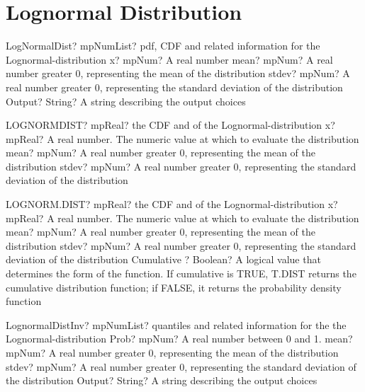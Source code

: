 \documentclass[12pt,a4paper,openany]{book}
\begin{document}
\section{Lognormal Distribution}

\begin{mpFunctionsExtract}
\mpFunctionFourNotImplemented
{LogNormalDist? mpNumList? pdf, CDF and related information for the Lognormal-distribution}
{x? mpNum? A real number}
{mean? mpNum? A real number greater 0, representing the mean of the distribution}
{stdev? mpNum? A real number greater 0, representing the standard deviation of the distribution}
{Output? String? A string describing the output choices}
\end{mpFunctionsExtract}

\begin{mpFunctionsExtract}
\mpWorksheetFunctionThreeNotImplemented
{LOGNORMDIST? mpReal? the CDF and of the Lognormal-distribution}
{x? mpReal? A real number. The numeric value at which to evaluate the distribution}
{mean? mpNum? A real number greater 0, representing the mean of the distribution}
{stdev? mpNum? A real number greater 0, representing the standard deviation of the distribution}
\end{mpFunctionsExtract}

\begin{mpFunctionsExtract}
\mpWorksheetFunctionFourNotImplemented
{LOGNORM.DIST? mpReal? the CDF and of the Lognormal-distribution}
{x? mpReal? A real number. The numeric value at which to evaluate the distribution}
{mean? mpNum? A real number greater 0, representing the mean of the distribution}
{stdev? mpNum? A real number greater 0, representing the standard deviation of the distribution}
{Cumulative ? Boolean? A logical value that determines the form of the function. If cumulative is TRUE, T.DIST returns the cumulative distribution function; if FALSE, it returns the probability density function}
\end{mpFunctionsExtract}

\begin{mpFunctionsExtract}
\mpFunctionFourNotImplemented
{LognormalDistInv? mpNumList? quantiles and related information for the the Lognormal-distribution}
{Prob? mpNum? A real number between 0 and 1.}
{mean? mpNum? A real number greater 0, representing the mean of the distribution}
{stdev? mpNum? A real number greater 0, representing the standard deviation of the distribution}
{Output? String? A string describing the output choices}
\end{mpFunctionsExtract}
\end{document}
